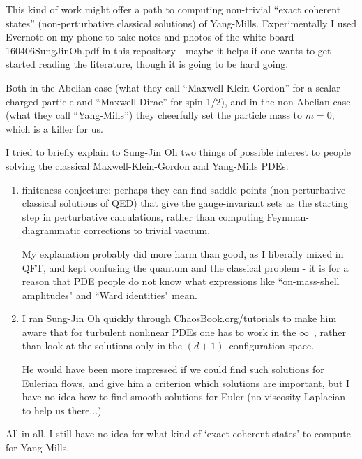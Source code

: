 \begin{description}
This kind of work might offer a path to computing non-trivial ``exact
coherent states'' (non-perturbative classical solutions) of Yang-Mills.
Experimentally I used Evernote on my phone to take notes and photos of
the white board -
 {160406SungJinOh.pdf} in this repository -
maybe it helps if one wants to get started reading the literature, though
it is going to be hard going.

Both in the Abelian case (what they call ``Maxwell-Klein-Gordon'' for a
scalar charged particle and ``Maxwell-Dirac'' for spin 1/2), and in the
non-Abelian case (what they call ``Yang-Mills'') they cheerfully set the
particle mass to $m=0$, which is a killer for us.

I tried to briefly explain to Sung-Jin Oh two things of possible interest
to people solving the classical Maxwell-Klein-Gordon and Yang-Mills PDEs:

\begin{enumerate}
  \item
{}
{finiteness conjecture}: perhaps they can find saddle-points
(non-perturbative classical solutions of QED) that give the
gauge-invariant sets as the starting step in perturbative calculations,
rather than computing Feynman-diagrammatic corrections to trivial vacuum.

My explanation probably did more harm than good, as I liberally mixed in
QFT, and kept confusing the quantum and the classical problem - it is for
a reason that PDE people do not know what expressions like
``on-mass-shell amplitudes" and ``Ward identities" mean.

  \item
I ran Sung-Jin Oh quickly through 
{ChaosBook.org/tutorials} to make him aware that for turbulent nonlinear
PDEs one has to work in the $\infty$\dmn\ \statesp, rather than look at
the solutions only in the $(d+1)$\dmn\ configuration space.

He would have been more impressed if we could find such solutions for
Eulerian flows, and give him a criterion which solutions are important,
but I have no idea how to find smooth solutions for Euler (no viscosity
Laplacian to help us there...).

\end{enumerate}

All in all, I still have no idea for what kind of `exact coherent states'
to compute for Yang-Mills.

\end{description}
